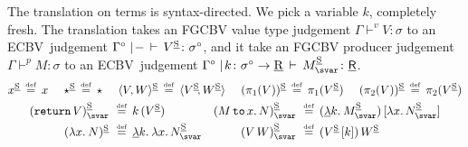 \documentclass{LMCS}
\newcommand{\vj}[3]{#1 \mathrel{\vdash^{v}} #2 \colon \! #3}
\newcommand{\pj}[3]{#1 \mathrel{\vdash^p} #2 \colon \! #3}
\newcommand{\STA}{\sigma}
\newcommand{\STB}{\tau}
\newcommand{\slet}[3]{#2 \, \codefont{to} \, #1 \ld #3}
\newcommand{\return}[1]{\codefont{return} \, #1}
\newcommand{\EECarbret}{\comptype{\mathsf{R}}}
\newcommand{\kvar}k
\newcommand{\codefont}[1]{\mathtt{#1}}
\newcommand{\comptype}[1]{\underline{#1}}
\newcommand{\linlambda}{\comptype{\lambda}}
\newcommand{\ld}{\mathpunct{.}}
\newcommand{\co}{\colon}
\newcommand{\llambda}{\linlambda}
\newcommand{\lam}[3]{\lambda #1.\: #3}
\newcommand{\llam}[3]{\llambda #1.\: #3}
\newcommand{\prj}[2]{\pi_{#1}(#2)}
\newcommand{\lpowerterm}[3]{\lambda #1.\, #3}
\newcommand{\rIn}[2]{#1 \colon  #2}
\newcommand{\aj}[4]{#1 \mid  \! #2 \, \vdash \, \rIn{#3}{#4}}
\newcommand{\tj}[3]{\aj{#1}{{-}}{#2}{#3}}
\newcommand{\ECBV}{ECBV}
\newcommand{\CBVtoEEC}[1]{#1^{\circ}}
\newcommand{\pair}[2]{\langle #1 , #2 \rangle}
\newcommand{\defeq}{\mathrel{\,\stackrel{\mbox{\tiny{$\mathrm{def}$}}}=\,}}
\begin{document}
The translation on terms is syntax-directed.
We pick a variable $\kvar$, completely fresh.
The translation takes an FGCBV value type judgement
${\vj{\Gamma}{V}{\STA}}$  
to an \ECBV\
judgement ${\tj{\CBVtoEEC{\Gamma}}{\CBVtoEECV{V}}{\CBVtoEEC{\STA}}}$,
and it take an FGCBV producer judgement $\pj{\Gamma}{M}{\STA}$ 
to an \ECBV\ judgement ${\aj{\CBVtoEEC{\Gamma}}{\kvar \co \lneg {\CBVtoEEC \STA}}
{\CBVtoEECP{M}}{\EECarbret}}$.
\begin{gather*}
\CBVtoEECV{x} \defeq x 
\ \!\quad\!\ \CBVtoEECV{\star} \defeq \star 
\ \!\quad\! \ 
\CBVtoEECV{\pair{V}{W}}\defeq \pair{\CBVtoEECV{V}\!}{\CBVtoEECV{W}} 
\ \!\quad\!\ 
\CBVtoEECV{(\prj 1{V})}\defeq\prj 1{\CBVtoEECV{V}} 
\ \!\quad\!\ 
\CBVtoEECV{(\prj 2{V})}\defeq\prj 2{\CBVtoEECV{V}} 
\\
\begin{aligned}
\CBVtoEECP{(\return{V})} & \, \defeq \kvar \,(\CBVtoEECV V)
&
\CBVtoEECP{(\slet{x}{M}{N})} & \, \defeq 
(\llam \kvar {\lneg{\CBVtoEEC \sigma}}{\CBVtoEECP M})\,
[\lpowerterm x {\CBVtoEEC \sigma}{\CBVtoEECP N}]
\\
\CBVtoEECV{(\lam{x}{\STA}{N})} & \, \defeq 
\llam{k}{\lneg{\CBVtoEEC\STB}}{\lpowerterm x{\STA}{\CBVtoEECP N}} &
\CBVtoEECP{(V \, W)} & \, \defeq 
(\CBVtoEECV V\,[k])\,\CBVtoEECV W
\end{aligned}
\end{gather*}
\end{document}
